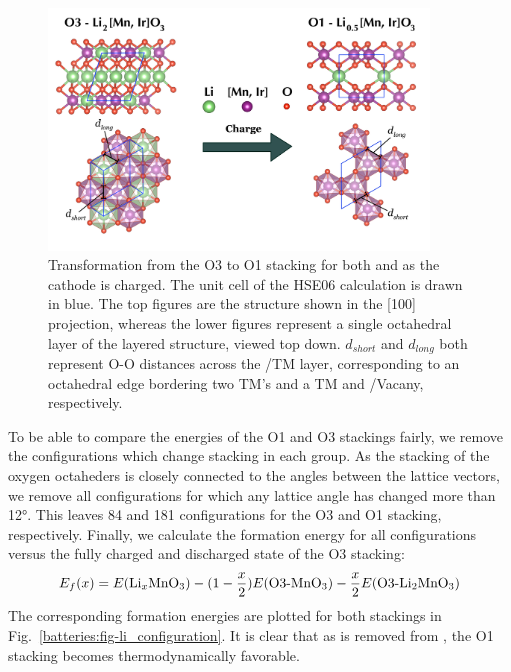 \begin{refsection}
\begin{figure}[h] 
\centering 
\includegraphics[width=0.9\textwidth]{figures/batteries/structural_change.png} 
\caption{Transformation from the O3 to O1 stacking for both  and 
 as the cathode is charged. The unit cell of the HSE06 calculation 
is drawn in blue. The top figures are the structure shown in the [100] 
projection, whereas the lower figures represent a single octahedral layer of 
the layered structure, viewed top down.  $d_{short}$ and $d_{long}$ both 
represent O-O distances across the /TM layer, corresponding to an 
octahedral edge bordering two TM's and a TM and /Vacany, respectively.} 
\label{batteries:fig-structural_change} 
\end{figure} 
 
To be able to compare the energies of the O1 and O3 stackings fairly, we 
remove the configurations which change stacking in each group. As the stacking 
of the oxygen octaheders is closely connected to the angles between the 
lattice vectors, we remove all configurations for which any lattice angle has 
changed more than 12\si{\degree}. This leaves 84 and 181 configurations for 
the O3 and O1 stacking, respectively. Finally, we calculate the formation 
energy for all configurations versus the fully charged and discharged state of 
the O3 stacking: 
\begin{equation} 
E_f (x) = E(\ce{Li_xMnO3}) - (1 - \frac{x}{2}) E(\text{O3-}\ce{MnO3}) - 
\frac{x}{2} E(\text{O3-}\ce{Li2MnO3}) 
\end{equation} 
The corresponding formation energies are plotted for both stackings in 
Fig.~\ref{batteries:fig-li_configuration}. It is clear that as  is 
removed from , the O1 stacking becomes thermodynamically 
favorable. 
 

\end{refsection}
